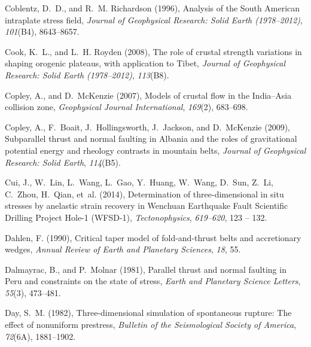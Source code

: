 \documentclass[twocolumn,jgrga]{AGUTeX}
\begin{document}
\begin{article}
{{\begin{thebibliography}{87}
Coblentz, D.~D., and R.~M. Richardson (1996), Analysis of the {S}outh
  {A}merican intraplate stress field, \textit{Journal of Geophysical Research:
  Solid Earth (1978--2012)}, \textit{101}(B4), 8643--8657.

Cook, K.~L., and L.~H. Royden (2008), The role of crustal strength variations
  in shaping orogenic plateaus, with application to {T}ibet, \textit{Journal of
  Geophysical Research: Solid Earth (1978--2012)}, \textit{113}(B8).

Copley, A., and D.~McKenzie (2007), Models of crustal flow in the
  {I}ndia--{A}sia collision zone, \textit{Geophysical Journal International},
  \textit{169}(2), 683--698.

Copley, A., F.~Boait, J.~Hollingsworth, J.~Jackson, and D.~McKenzie (2009),
  Subparallel thrust and normal faulting in {A}lbania and the roles of
  gravitational potential energy and rheology contrasts in mountain belts,
  \textit{Journal of Geophysical Research: Solid Earth}, \textit{114}(B5).

Cui, J., W.~Lin, L.~Wang, L.~Gao, Y.~Huang, W.~Wang, D.~Sun, Z.~Li, C.~Zhou,
  H.~Qian, et~al. (2014), Determination of three-dimensional in situ stresses
  by anelastic strain recovery in {W}enchuan {E}arthquake {F}ault {S}cientific
  {D}rilling {P}roject {H}ole-1 ({W}{F}{S}{D}-1), \textit{Tectonophysics},
  \textit{619–620}, 123 -- 132.

Dahlen, F. (1990), Critical taper model of fold-and-thrust belts and
  accretionary wedges, \textit{Annual Review of Earth and Planetary Sciences},
  \textit{18}, 55.

Dalmayrac, B., and P.~Molnar (1981), Parallel thrust and normal faulting in
  {P}eru and constraints on the state of stress, \textit{Earth and Planetary
  Science Letters}, \textit{55}(3), 473--481.

Day, S.~M. (1982), Three-dimensional simulation of spontaneous rupture: {T}he
  effect of nonuniform prestress, \textit{Bulletin of the Seismological Society
  of America}, \textit{72}(6A), 1881--1902.


\end{thebibliography}}}
\end{article}
\end{document}
